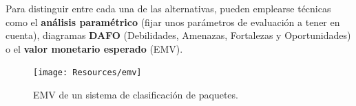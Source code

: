 Para distinguir entre cada una de las alternativas, pueden emplearse técnicas como el \textbf{análisis paramétrico} (fijar unos parámetros de evaluación a tener en cuenta), diagramas \textbf{DAFO} (Debilidades, Amenazas, Fortalezas y Oportunidades) o el \textbf{valor monetario esperado} (EMV).
    \begin{table}[h]
        \centering
        \caption{Análisis paramétrico de un sistema de clasificación de paquetes.}
        \label{tab:analisisParametrico}
    \end{table}

    \begin{figure}[H]
        \centering
        \texttt{[image: Resources/emv]}
        \caption{EMV de un sistema de clasificación de paquetes.}
        \label{fig:emv}
    \end{figure}

